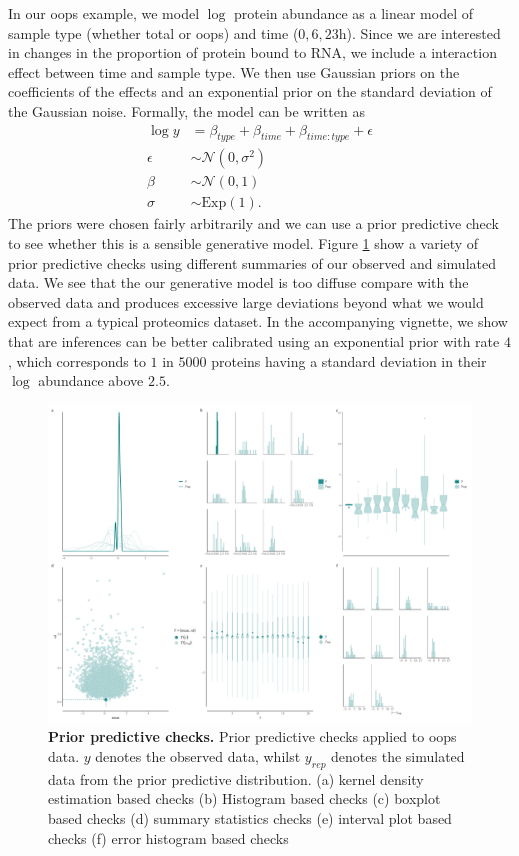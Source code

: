 \documentclass[12pt,english, journal=jpr, layout=twocolumn]{article}
\begin{document}
In our oops example, we model $\log$ protein abundance as a linear model of sample type (whether total or oops) and time ($0,6,23$h). Since we are interested in changes in the proportion of protein bound to RNA, we include a interaction effect between time and sample type. We then use Gaussian priors on the coefficients of the effects and an exponential prior on the standard deviation of the Gaussian noise. Formally, the model can be written as
\begin{equation}
\begin{split}
\log y &= \beta_{type} + \beta_{time} + \beta_{time:type} + \epsilon\\
\epsilon &\sim \mathcal{N}(0, \sigma^2)\\
\beta &\sim \mathcal{N}(0, 1)\\
\sigma &\sim \text{Exp}(1).
\end{split}
\end{equation}
The priors were chosen fairly arbitrarily and we can use a prior predictive check to see whether this is a sensible generative model. Figure \ref{figure::figure2} show a variety of prior predictive checks using different summaries of our observed and simulated data. We see that the our generative model is too diffuse compare with the observed data and produces excessive large deviations beyond what we would expect from a typical proteomics dataset. In the accompanying vignette, we show that are inferences can be better calibrated using an exponential prior with rate $4$, which corresponds to $1$ in $5000$ proteins having a standard deviation in their $\log$ abundance above $2.5$.

\begin{figure}[h!]
	\centering
	\includegraphics[width =1\textwidth]{priorpredictvechecks1.pdf}
	\caption{\textbf{Prior predictive checks.} Prior predictive checks applied to oops data. $y$ denotes the observed data, whilst $y_{rep}$ denotes the simulated data from the prior predictive distribution. (a) kernel density estimation based checks (b) Histogram based checks (c) boxplot based checks (d) summary statistics checks (e) interval plot based checks (f) error histogram based checks}
	\label{figure::figure2}
\end{figure}
\end{document}

